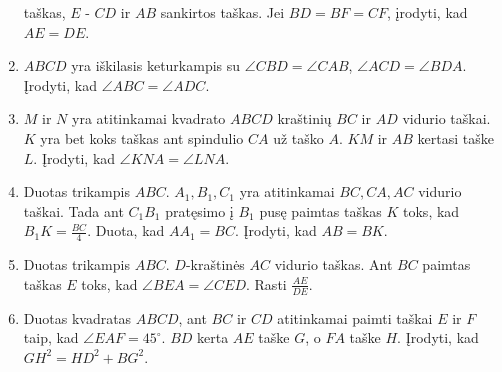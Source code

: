 \begin{enumerate}
  taškas, $E$ - $CD$ ir $AB$ sankirtos taškas.  Jei $BD = BF = CF$,
  įrodyti, kad $AE = DE$.
\item $ABCD$ yra iškilasis keturkampis su $\angle CBD = \angle CAB$,
  $\angle ACD = \angle BDA$. Įrodyti, kad $\angle ABC = \angle ADC$.
   \item $M$ ir $N$ yra atitinkamai kvadrato $ABCD$ kraštinių $BC$ ir $AD$
  vidurio taškai. $K$ yra bet koks taškas ant spindulio $CA$ už taško $A$.
  $KM$ ir $AB$ kertasi taške $L$. Įrodyti, kad $\angle KNA = \angle LNA$.
\item Duotas trikampis $ABC$. $A_1, B_1, C_1$ yra atitinkamai $BC, CA, AC$
  vidurio taškai. Tada ant $C_1 B_1$ pratęsimo į $B_1$ pusę paimtas taškas
  $K$ toks, kad $B_1 K = \frac{BC}{4}$. Duota, kad  $AA_1 = BC$. Įrodyti,
  kad $AB = BK$.
  \item Duotas trikampis $ABC$. $D$-kraštinės $AC$ vidurio taškas. Ant $BC$
  paimtas taškas $E$ toks, kad $\angle BEA =\angle CED$. Rasti
  $\frac{AE}{DE}$.
\item Duotas kvadratas $ABCD$, ant $BC$ ir $CD$ atitinkamai paimti taškai 
  $E$ ir $F$ taip, kad $\angle EAF=45^\circ$. $BD$ kerta $AE$ taške $G$, o
  $FA$ taške $H$. Įrodyti, kad $GH^2=HD^2+BG^2$.

\end{enumerate}
